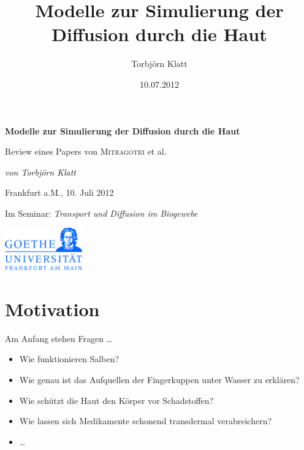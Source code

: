 \documentclass[utf8x,compress,professionalfonts]{beamer}
\title[Simulation der Diffusion durch die Haut]{Modelle zur Simulierung der Diffusion durch die Haut}
\author{Torbj\"orn Klatt}
\institute{Goethe-Universi\"at Frankfurt am Main}
\date{10.07.2012}
\begin{document}
\begin{frame}
  \begin{center}
    {\Large \textbf{Modelle zur Simulierung der Diffusion durch die Haut} \par}
    \bigskip

    {\scriptsize Review eines Papers von \textsc{Mitragotri} et al. \par}
    \bigskip

    {\small \textit{von Torbj\"orn Klatt} \par}
    \bigskip

    {\scriptsize Frankfurt a.M., 10. Juli 2012 \par}
    \bigskip

    {\scriptsize Im Seminar: \textit{Transport und Diffusion im Biogewebe} \par}
    \bigskip

    \includegraphics[width=0.25\textwidth]{goethe_uni.png}
  \end{center}
\end{frame}

\section{Motivation}
\begin{frame}{Am Anfang stehen Fragen \dots}
  \begin{itemize}
    \item<1-> Wie funktionieren Salben?
      \bigskip
    \item<2-> Wie genau ist das Aufquellen der Fingerkuppen unter Wasser zu
      erkl\"aren?
      \bigskip
    \item<3-> Wie sch\"utzt die Haut den K\"orper vor Schadstoffen?
      \bigskip
    \item<4-> Wie lassen sich Medikamente schonend transdermal verabreichern?
      \bigskip
    \item<5-> \dots
  \end{itemize}
\end{frame}
\end{document}
